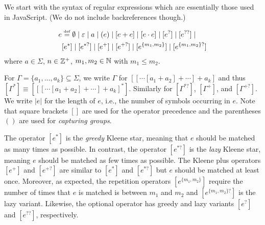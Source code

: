 We start with the syntax of regular expressions %
which are essentially those used in JavaScript. (We do not include backreferences though.)
\begin{definition}	
	\[
	\begin{split}
		e & \eqdef  \emptyset \mid \varepsilon \mid a \mid  (e) \mid %
		[e + e] \mid [e \concat e] \mid [e^?] \mid [e^{??}] \mid  \\
		&          [e^*]  \mid [e^{*?}] \mid [e^+] \mid  [e^{+?}] \mid [e^{\{m_1,m_2\}}] \mid [e^{\{m_1,m_2\}?}] 
	\end{split}
	\]
	where $a \in \Sigma$,  $n \in \mathbb{Z}^+$, $m_1,m_2 \in \mathbb{N}$ with $m_1 \le m_2$. 
\end{definition}
%
For $\Gamma = \{a_1, \ldots, a_k\}\subseteq \Sigma$, we write $\Gamma$ for  $[[\cdots [a_1 + a_2] + \cdots] + a_k]$ and thus $[\Gamma^\ast] \equiv [[[\cdots [a_1 + a_2] + \cdots] + a_k]^\ast]$. Similarly for $[\Gamma^{\ast?}]$, $[\Gamma^+]$, and $[\Gamma^{+?}]$. We write $|e|$ for the length of $e$, i.e., the number of symbols occurring in $e$.
%
Note that square brackets $[]$ are used for the operator precedence and the parentheses $()$ are used for \emph{capturing groups}. 
%
%

The operator $[e^*]$ is the \emph{greedy} Kleene star, meaning that $e$ should be matched as many times as possible. In contrast, the operator $[e^{*?}]$ is the \emph{lazy} Kleene star, meaning $e$ should be matched  as few times as possible. The Kleene plus operators $[e^+]$ and $[e^{+?}]$ are similar to $[e^*]$ and $[e^{*?}]$ but $e$ should be matched at least once. Moreover, as expected,  the repetition operators $[e^{\{m_1,m_2\}}]$ require the number of times that $e$ is matched is between $m_1$ and $m_2$ and $[e^{\{m_1,m_2\}?}]$ is the lazy variant. Likewise, the optional operator has greedy and lazy variants $[e^?]$ and $[e^{??}]$, respectively. 

